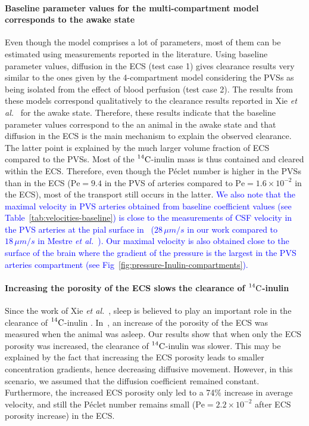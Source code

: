 \documentclass[10pt]{article}
\newcommand{\etal}{\emph{et al.}\;}
\newcommand{\1}{^{(1)}}
\newcommand{\2}{^{(2)}}
\newcommand{\Cinulin}{$\prescript{14}{}{\text{C}}$-inulin }
\newcommand{\corr}[1]{\textcolor{blue}{#1}}
\begin{document}
\paragraph{Baseline parameter values for the multi-compartment model corresponds to the awake state}
Even though the model comprises a lot of parameters, most of them can be estimated using measurements reported in the literature. Using baseline parameter values, diffusion in the ECS (test case 1) gives clearance results very similar to the ones given by the 4-compartment model considering the PVSs as being isolated from the effect of blood perfusion (test case 2). The results from these models correspond qualitatively to the clearance results reported in Xie \etal~\cite{Xie_2013_sleep} for the awake state. Therefore, these results indicate that the baseline parameter values correspond to the an animal in the awake state and that diffusion in the ECS is the main mechanism to explain the observed clearance. The latter point is explained by the much larger volume fraction of ECS compared to the PVSs. Most of the \Cinulin mass is thus contained and cleared within the ECS. Therefore, even though the P\'eclet number is higher in the PVSs than in the ECS ($\text{Pe}=9.4$ in the PVS of arteries compared to $\text{Pe} = 1.6\times 10^{-2}$ in the ECS), most of the transport still occurs in the latter. \corr{We also note that the maximal velocity in PVS arteries obtained from baseline coefficient values (see Table~\ref{tab:velocities-baseline}) is close to the measurements of CSF velocity in the PVS arteries at the pial surface in~\cite{mestre_flow_2018} ($28 \, \si{\mu m/s}$ in our work compared to $18 \,\si{\mu m/s}$ in Mestre \etal~\cite{mestre_flow_2018}). Our maximal velocity is also obtained close to the surface of the brain where the gradient of the pressure is the largest in the PVS arteries compartment (see Fig~\ref{fig:pressure-Inulin-compartments}).}

\paragraph{Increasing the porosity of the ECS slows the clearance of \Cinulin}

Since the work of Xie \etal~\cite{Xie_2013_sleep}, sleep is believed to play an important role in the clearance of \Cinulin. In~\cite{Xie_2013_sleep}, an increase of the porosity of the ECS was measured when the animal was asleep. 
Our results show that when only the ECS porosity was increased, the clearance of \Cinulin was slower. This may be explained by the fact that increasing the ECS porosity leads to smaller concentration gradients, hence decreasing diffusive movement. However, in this scenario, we assumed that the diffusion coefficient remained constant. 
Furthermore, the increased ECS porosity only led to a 74\% increase in average velocity, and still the P\'eclet number remains small ($\text{Pe} = 2.2 \times 10^{-2}$ after ECS porosity increase) in the ECS.
\end{document}
